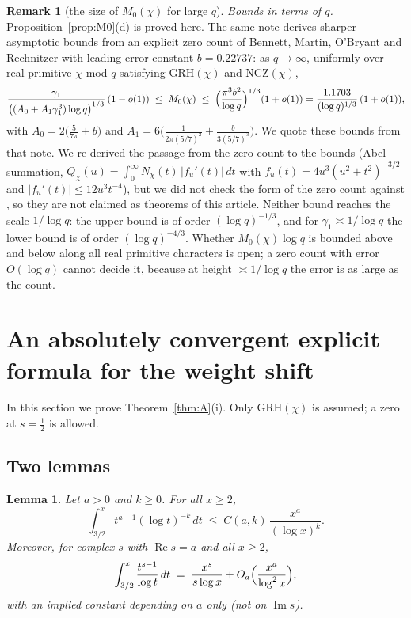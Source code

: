 \documentclass[11pt]{amsart}
\newtheorem{lemma}[theorem]{Lemma}
\theoremstyle{definition}
\newtheorem{remark}[theorem]{Remark}
\numberwithin{equation}{section}
\newcommand{\re}{\operatorname{Re}}
\newcommand{\im}{\operatorname{Im}}
\begin{document}
\begin{remark}[the size of $M_0(\chi)$ for large $q$]
\emph{Bounds in terms of $q$.} Proposition~\ref{prop:M0}(d) is proved
here. The same note derives sharper asymptotic bounds from an
explicit zero count of Bennett, Martin, O'Bryant and Rechnitzer
\cite{BMOR21} with leading error constant $b=0.22737$: as
$q\to\infty$, uniformly over real primitive $\chi$ mod $q$ satisfying
GRH$(\chi)$ and NCZ$(\chi)$,
\[
\frac{\gamma_1}{\bigl((A_0+A_1\gamma_1^3)\log q\bigr)^{1/3}}\,(1-o(1))
\;\le\;M_0(\chi)\;\le\;
\Bigl(\frac{\pi^3b^2}{\log q}\Bigr)^{1/3}(1+o(1))
=\frac{1.1703}{(\log q)^{1/3}}\,(1+o(1)),
\]
with $A_0=2\bigl(\tfrac5{7\pi}+b\bigr)$ and
$A_1=6\bigl(\tfrac1{2\pi(5/7)^2}+\tfrac{b}{3(5/7)^3}\bigr)$. We quote
these bounds from that note. We re-derived the passage from the zero
count to the bounds (Abel summation,
$Q_\chi(u)=\int_0^\infty N_\chi(t)\,|f_u'(t)|\,dt$ with
$f_u(t)=4u^3(u^2+t^2)^{-3/2}$ and $|f_u'(t)|\le12u^3t^{-4}$), but we
did not check the form of the zero count against \cite{BMOR21}, so
they are not claimed as theorems of this article. Neither bound
reaches the scale $1/\log q$: the upper bound is of order
$(\log q)^{-1/3}$, and for $\gamma_1\asymp1/\log q$ the lower bound is
of order $(\log q)^{-4/3}$. Whether $M_0(\chi)\log q$ is bounded above
and below along all real primitive characters is open; a zero count
with error $O(\log q)$ cannot decide it, because at height
$\asymp1/\log q$ the error is as large as the count.
\end{remark}

\section{An absolutely convergent explicit formula for the weight shift}
\label{sec:formula}

In this section we prove Theorem~\ref{thm:A}(i). Only GRH$(\chi)$ is
assumed; a zero at $s=\tfrac12$ is allowed.

\subsection{Two lemmas}

\begin{lemma}\label{lem:intlog}
Let $a>0$ and $k\ge0$. For all $x\ge2$,
\[
\int_{3/2}^xt^{a-1}(\log t)^{-k}\,dt\;\le\;C(a,k)\,\frac{x^a}{(\log x)^k}.
\]
Moreover, for complex $s$ with $\re s=a$ and all $x\ge2$,
\begin{equation}\label{eq:intlog-s}
\int_{3/2}^x\frac{t^{s-1}}{\log t}\,dt\;=\;\frac{x^s}{s\log x}
+O_a\Bigl(\frac{x^a}{\log^2x}\Bigr),
\end{equation}
with an implied constant depending on $a$ only (not on $\im s$).
\end{lemma}
\end{document}
